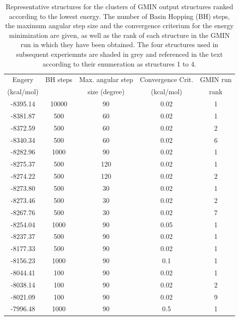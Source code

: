 \documentclass[english, a4paper, 12pt, titlepage, draft]{article}
\begin{document}
\begin{table}
\centering
\begin{tabular}{c c c c c}
    \hline \hline
    Engery     & BH steps & Max. angular step & Convergence Crit. & GMIN run \\ 
    (kcal/mol) &          & size (degree)     & (kcal/mol)        & rank     \\
    \hline
    \rowcolor{lightgray}
    -8395.14   & 10000    &  90               & 0.02              & 1        \\ 
    \rowcolor{lightgray}
    -8381.87   &   500    &  60               & 0.02              & 1        \\
    -8372.59   &   500    &  60               & 0.02              & 2        \\
    \rowcolor{lightgray}
    -8340.34   &   500    &  60               & 0.02              & 6        \\
    -8282.96   &  1000    &  90               & 0.02              & 1        \\
    \rowcolor{lightgray}
    -8275.37   &   500    & 120               & 0.02              & 1        \\
    -8274.22   &   500    & 120               & 0.02              & 2        \\
    -8273.80   &   500    &  30               & 0.02              & 1        \\
    -8273.46   &   500    &  30               & 0.02              & 2        \\
    -8267.76   &   500    &  30               & 0.02              & 7        \\
    -8254.04   &  1000    &  90               & 0.05              & 1        \\
    -8237.37   &   500    &  90               & 0.02              & 1        \\
    -8177.33   &   500    &  90               & 0.02              & 1        \\
    -8156.23   &  1000    &  90               & 0.1               & 1        \\
    -8044.41   &   100    &  90               & 0.02              & 1        \\
    -8038.14   &   100    &  90               & 0.02              & 2        \\
    -8021.09   &   100    &  90               & 0.02              & 9        \\
    -7996.48   &  1000    &  90               & 0.5               & 1        \\
    \hline \hline
\end{tabular}
\caption{Representative structures for the clusters of GMIN output structures ranked according to the lowest energy.
The number of Basin Hopping (BH) steps, the maximum angular step size and the convergence criterium for the energy minimization are given, as well as the rank of each structure in the GMIN run in which they have been obtained.
    The four structures used in subsequent experiemnts are shaded in grey and referenced in the text according to their enumeration as structures 1 to 4.}
\label{tab:GMIN_structures}
\end{table} 
\end{document}
